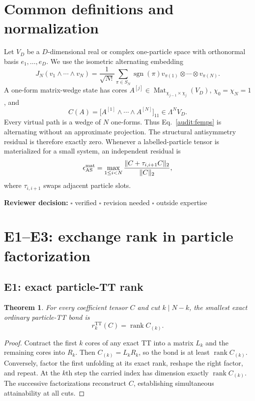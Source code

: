 \documentclass[11pt]{article}
\newtheorem{theorem}{Theorem}[section]
\theoremstyle{definition}
\newcommand{\TT}{\mathrm{TT}}
\newcommand{\rank}{\operatorname{rank}}
\newcommand{\Mat}{\operatorname{Mat}}
\newcommand{\reviewline}{\par\smallskip\noindent
  \textbf{Reviewer decision:} $\square$ verified \quad $\square$ revision
  needed \quad $\square$ outside expertise\par\medskip}
\begin{document}
\section{Common definitions and normalization}

Let $V_D$ be a $D$-dimensional real or complex one-particle space with
orthonormal basis $e_1,\ldots,e_D$.  We use the isometric alternating embedding
\begin{equation}
J_N(v_1\wedge\cdots\wedge v_N)=\frac{1}{\sqrt{N!}}
\sum_{\pi\in S_N}\operatorname{sgn}(\pi)
v_{\pi(1)}\otimes\cdots\otimes v_{\pi(N)}.
\label{audit:isometry}
\end{equation}
A one-form matrix-wedge state has cores
$A^{[j]}\in\Mat_{\chi_{j-1}\times\chi_j}(V_D)$,
$\chi_0=\chi_N=1$, and
\begin{equation}
C(A)=\bigl[A^{[1]}\wedge\cdots\wedge A^{[N]}\bigr]_{11}
\in\Lambda^N V_D.
\label{audit:femps}
\end{equation}
Every virtual path is a wedge of $N$ one-forms.  Thus Eq.~\eqref{audit:femps}
is alternating without an approximate projection.  The structural
antisymmetry residual is therefore exactly zero.  Whenever a labelled-particle
tensor is materialized for a small system, an independent residual is
\begin{equation}
\epsilon_{\rm AS}^{\rm mat}
=\max_{1\le i<N}
\frac{\|C+\tau_{i,i+1}C\|_2}{\|C\|_2},
\label{audit:asres}
\end{equation}
where $\tau_{i,i+1}$ swaps adjacent particle slots.

\reviewline

\section{E1--E3: exchange rank in particle factorization}

\subsection{E1: exact particle-TT rank}

\begin{theorem}
For every coefficient tensor $C$ and cut $k\mid N-k$, the smallest exact
ordinary particle-TT bond is
\begin{equation}
r_k^{\TT}(C)=\rank C_{(k)}.
\end{equation}
\end{theorem}

\begin{proof}
Contract the first $k$ cores of any exact TT into a matrix $L_k$ and the
remaining cores into $R_k$.  Then $C_{(k)}=L_kR_k$, so the bond is at least
$\rank C_{(k)}$.  Conversely, factor the first unfolding at its exact rank,
reshape the right factor, and repeat.  At the $k$th step the carried index has
dimension exactly $\rank C_{(k)}$.  The successive factorizations reconstruct
$C$, establishing simultaneous attainability at all cuts.
\end{proof}
\end{document}
